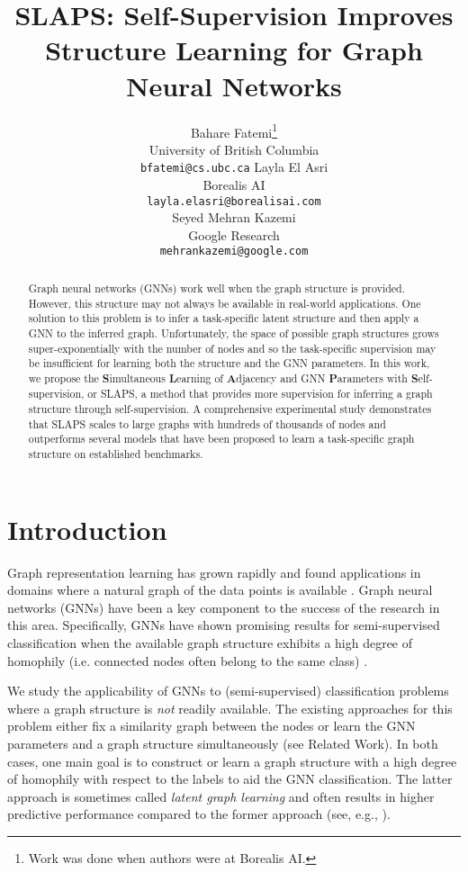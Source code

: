 \documentclass{article}
\title{SLAPS: Self-Supervision Improves Structure Learning for Graph Neural Networks}
\author{Bahare Fatemi\thanks{Work was done when authors were at Borealis AI.} \\
  University of British Columbia\\
  \texttt{bfatemi@cs.ubc.ca}
\AND
   Layla El Asri \\
   Borealis AI \\
\texttt{layla.elasri@borealisai.com} \\
   \And
   Seyed Mehran Kazemi\\
   Google Research \\
\texttt{mehrankazemi@google.com} \\
}
\begin{document}
\maketitle

\begin{abstract}
Graph neural networks (GNNs) work well when the graph structure is provided. However, this structure may not always be available in real-world applications.
One solution to this problem is to infer a task-specific latent structure and then apply a GNN to the inferred graph. Unfortunately, the space of possible graph structures grows super-exponentially with the number of nodes and so the task-specific supervision may be insufficient for learning both the structure and the GNN parameters.
In this work, we propose the \textbf{S}imultaneous \textbf{L}earning of \textbf{A}djacency and GNN \textbf{P}arameters with \textbf{S}elf-supervision, or SLAPS, a method that provides more supervision for inferring a graph structure through self-supervision. 
A comprehensive experimental study demonstrates that SLAPS scales to large graphs with hundreds of thousands of nodes and outperforms several models that have been proposed to learn a task-specific graph structure on established benchmarks.
\end{abstract}
\section{Introduction} \label{sec:intro}
Graph representation learning has grown rapidly and found applications in domains where a natural graph of the data points is available \citep{chami2020machine,kazemi2020relational}. Graph neural networks (GNNs) \citep{scarselli2008graph} have been a key component to the success of the research in this area. Specifically, GNNs have shown promising results for semi-supervised classification when the available graph structure exhibits a high degree of homophily (i.e. connected nodes often belong to the same class) \cite{zhu2020beyond}. 

We study the applicability of GNNs to (semi-supervised) classification problems where a graph structure is \emph{not} readily available. The existing approaches for this problem either fix a similarity graph between the nodes or learn the GNN parameters and a graph structure simultaneously (see Related Work). In both cases, one main goal is to construct or learn a graph structure with a high degree of homophily with respect to the labels to aid the GNN classification. The latter approach is sometimes called \emph{latent graph learning} and often results in higher predictive performance compared to the former approach (see, e.g., \cite{franceschi2019learning}).
\end{document}
